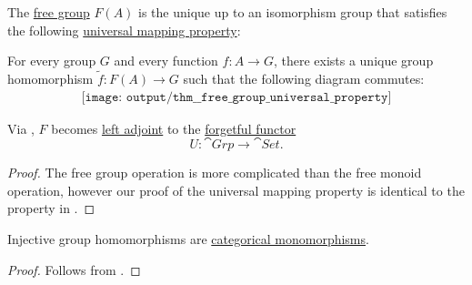 \begin{theorem}\label{thm:free_group_universal_property}
  The \hyperref[def:free_group]{free group} \( F(A) \) is the unique up to an isomorphism group that satisfies the following \hyperref[rem:universal_mapping_property]{universal mapping property}:
  \begin{displayquote}
    For every group \( G \) and every function \( f: A \to G \), there exists a unique group homomorphism \( \widetilde{f}: F(A) \to G \) such that the following diagram commutes:
    \begin{equation}\label{eq:thm:free_group_universal_property/diagram}
      \begin{aligned}
        \texttt{[image: output/thm\_\_free\_group\_universal\_property]}
      \end{aligned}
    \end{equation}
  \end{displayquote}

  Via , \( F \) becomes \hyperref[def:category_adjunction]{left adjoint} to the \hyperref[def:concrete_category]{forgetful functor}
  \begin{equation*}
    U: \cat{Grp} \to \cat{Set}.
  \end{equation*}
\end{theorem}
\begin{proof}
  The free group operation is more complicated than the free monoid operation, however our proof of the universal mapping property is identical to the property in .
\end{proof}

\begin{corollary}\label{thm:injective_group_homomorphisms_are_monomorphisms}
  Injective group homomorphisms are \hyperref[def:morphism_invertibility/left_cancellative]{categorical monomorphisms}.
\end{corollary}
\begin{proof}
  Follows from .
\end{proof}

